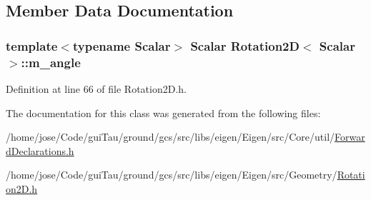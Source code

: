 \subsection{Member Data Documentation}
\hypertarget{class_rotation2_d_a3e2bc572b086b9f9ef56334f5d5b02e9}{
\subsubsection[{m\-\_\-angle}]{\setlength{\rightskip}{0pt plus 5cm}template$<$typename Scalar$>$ {\bf Scalar} {\bf Rotation2\-D}$<$ {\bf Scalar} $>$\-::m\-\_\-angle\hspace{0.3cm}{\ttfamily [protected]}}}\label{class_rotation2_d_a3e2bc572b086b9f9ef56334f5d5b02e9}


Definition at line 66 of file Rotation2\-D.\-h.



The documentation for this class was generated from the following files\-:\begin{DoxyCompactItemize}
\item 
/home/jose/\-Code/gui\-Tau/ground/gcs/src/libs/eigen/\-Eigen/src/\-Core/util/\hyperlink{_forward_declarations_8h}{Forward\-Declarations.\-h}\item 
/home/jose/\-Code/gui\-Tau/ground/gcs/src/libs/eigen/\-Eigen/src/\-Geometry/\hyperlink{_rotation2_d_8h}{Rotation2\-D.\-h}\end{DoxyCompactItemize}
